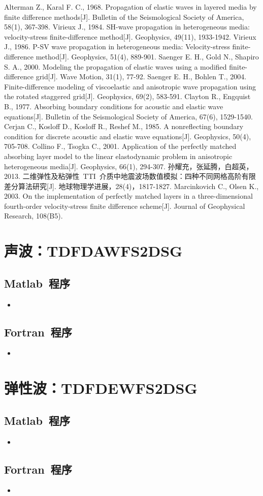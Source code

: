 \documentclass[UTF8]{ctexart}
\renewcommand{\thesection}{\chinese{section}、\kern -1em}                                            %
\newcommand{\insertFcode}[2]{\begin{itemize}\item[]\end{itemize}}
\newcommand{\insertMcode}[2]{\begin{itemize}\item[]\end{itemize}}
\begin{document}
\newpage
\begin{thebibliography}{9}
Alterman Z., Karal F. C., 1968. Propagation of elastic waves in layered media by finite difference methods[J]. Bulletin of the Seismological Society of America, 58(1), 367-398.
Virieux J., 1984. SH-wave propagation in heterogeneous media: velocity-stress finite-difference method[J]. Geophysics, 49(11), 1933-1942.
Virieux J., 1986. P-SV wave propagation in heterogeneous media: Velocity-stress finite-difference method[J]. Geophysics, 51(4), 889-901.
Saenger E. H., Gold N., Shapiro S. A., 2000. Modeling the propagation of elastic waves using a modified finite-difference grid[J]. Wave Motion, 31(1), 77-92.
Saenger E. H., Bohlen T., 2004. Finite-difference modeling of viscoelastic and anisotropic wave propagation using the rotated staggered grid[J]. Geophysics, 69(2), 583-591.
Clayton R., Engquist B., 1977. Absorbing boundary conditions for acoustic and elastic wave equations[J]. Bulletin of the Seismological Society of America, 67(6), 1529-1540.
Cerjan C., Kosloff D., Kosloff R., Reshef M., 1985. A nonreflecting boundary condition for discrete acoustic and elastic wave equations[J]. Geophysics, 50(4), 705-708.
Collino F., Tsogka C., 2001. Application of the perfectly matched absorbing layer model to the linear elastodynamic problem in anisotropic heterogeneous media[J]. Geophysics, 66(1), 294-307.
孙耀充，张延腾，白超英，2013. 二维弹性及粘弹性~TTI~介质中地震波场数值模拟：四种不同网格高阶有限差分算法研究[J]. 地球物理学进展，28(4)，1817-1827.
Marcinkovich C., Olsen K., 2003. On the implementation of perfectly matched layers in a three-dimensional fourth-order velocity-stress finite difference scheme[J]. Journal of Geophysical Research, 108(B5).
\end{thebibliography}

\newpage
\setmonofont{Consolas}                           %
\setsansfont{Consolas}                           %
\setmainfont{Consolas}                           %

\appendix
\renewcommand{\thesection}{附录\kern 0em}
\section{声波：TDFDAWFS2DSG}
\subsection{Matlab~程序}
\insertMcode{./Code/TDFDAWFS2DSG.m}{}
\subsection{Fortran~程序}
\insertFcode{./Code/TDFDAWFS2DSG.f90}{}

\newpage
\section{弹性波：TDFDEWFS2DSG}
\subsection{Matlab~程序}
\insertMcode{./Code/TDFDEWFS2DSG.m}{}
\subsection{Fortran~程序}
\insertFcode{./Code/TDFDEWFS2DSG.f90}{}
\end{document}
